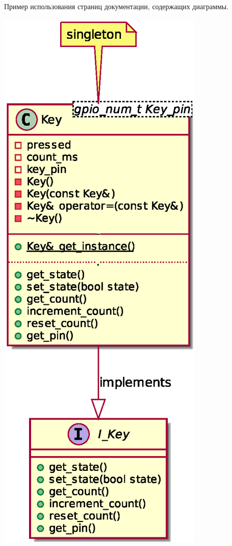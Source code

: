 Пример использования страниц документации, содержащих диаграммы.


\begin{DoxyImageNoCaption}
  \mbox{\includegraphics[width=\textwidth,height=\textheight/2,keepaspectratio=true]{inline_umlgraph_4}}
\end{DoxyImageNoCaption}
 